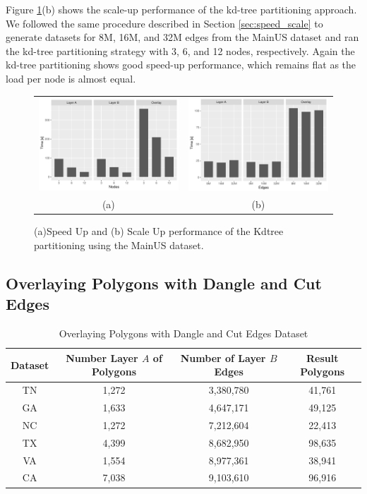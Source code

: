 Figure \ref{fig:k_scale_speed_us}(b) shows the scale-up performance of the kd-tree partitioning approach. We followed the same procedure described in Section \ref{sec:speed_scale} to generate datasets for 8M, 16M, and 32M edges from the MainUS dataset and ran the kd-tree partitioning strategy with 3, 6, and 12 nodes, respectively. Again the kd-tree partitioning shows good speed-up performance, which remains flat as the load per node is almost equal.

\begin{figure}
    \centering
    \begin{tabular}{cc}
        \includegraphics[width=0.49\linewidth]{chapterSDCEL/US_speedup.pdf} & \includegraphics[width=0.49\linewidth]{chapterSDCEL/US_scaleup.pdf} \\
        (a) & (b)
    \end{tabular}
    \caption{(a)Speed Up and (b) Scale Up performance of the Kdtree partitioning using the MainUS dataset.} \label{fig:k_scale_speed_us}
\end{figure}

\subsection{Overlaying Polygons with Dangle and Cut Edges}
\begin{table}
    \caption{Overlaying Polygons with Dangle and Cut Edges Dataset}
    \label{tab:dangles}
    \begin{tabular}{c c c c}
        \toprule
        Dataset & Number Layer $A$ of Polygons & Number of Layer $B$ Edges & Result Polygons \\
        \midrule
        TN & 1,272 & 3,380,780 & 41,761 \\
        GA & 1,633 & 4,647,171 & 49,125 \\
        NC & 1,272 & 7,212,604 & 22,413 \\
        TX & 4,399  & 8,682,950 & 98,635 \\
        VA & 1,554 & 8,977,361 & 38,941 \\
        CA & 7,038 & 9,103,610 & 96,916\\
        \bottomrule
    \end{tabular}
\end{table}

